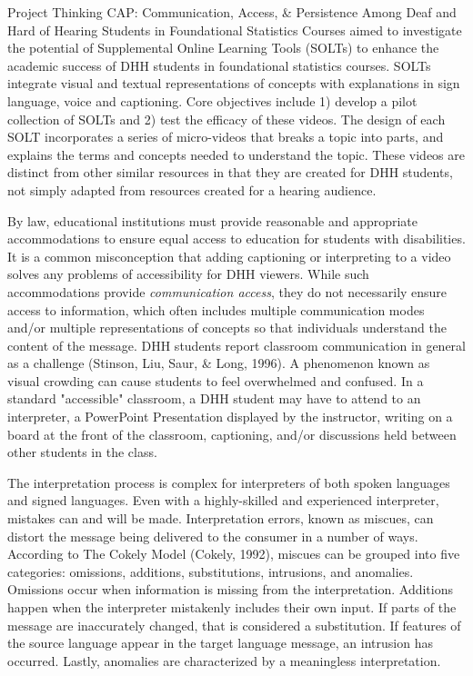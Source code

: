 \documentclass[11.5pt]{sig-alternate} %
\begin{document}
\begin{large}
Project Thinking CAP: Communication, Access, \& Persistence Among Deaf and Hard of Hearing Students in Foundational Statistics Courses aimed to investigate the potential of Supplemental Online Learning Tools (SOLTs) to enhance the academic success of DHH students in foundational statistics courses. SOLTs integrate visual and textual representations of concepts with explanations in sign language, voice and captioning. Core objectives include 1) develop a pilot collection of SOLTs and 2) test the efficacy of these videos. The design of each SOLT incorporates a series of micro-videos that breaks a topic into parts, and explains the terms and concepts needed to understand the topic. These videos are distinct from other similar resources in that they are created for DHH students, not simply adapted from resources created for a hearing audience.

By law, educational institutions must provide reasonable and appropriate accommodations to ensure equal access to education for students with disabilities. It is a common misconception that adding captioning or interpreting to a video solves any problems of accessibility for DHH viewers. While such accommodations provide \textit{communication access}, they do not necessarily ensure access to information, which often includes multiple communication modes and/or multiple representations of concepts so that individuals understand the content of the message. DHH students report classroom communication in general as a challenge (Stinson, Liu, Saur, \& Long, 1996). A phenomenon known as visual crowding can cause students to feel overwhelmed and confused. In a standard "accessible" classroom, a DHH student may have to attend to an interpreter, a PowerPoint Presentation displayed by the instructor, writing on a board at the front of the classroom, captioning, and/or discussions held between other students in the class. 

The interpretation process is complex for interpreters of both spoken languages and signed languages. Even with a highly-skilled and experienced interpreter, mistakes can and will be made. Interpretation errors, known as miscues, can distort the message being delivered to the consumer in a number of ways. According to The Cokely Model (Cokely, 1992), miscues can be grouped into five categories: omissions, additions, substitutions, intrusions, and anomalies. Omissions occur when information is missing from the interpretation. Additions happen when the interpreter mistakenly includes their own input. If parts of the message are inaccurately changed, that is considered a substitution. If features of the source language appear in the target language message, an intrusion has occurred. Lastly, anomalies are characterized by a meaningless interpretation. 


\end{large}
\end{document}
